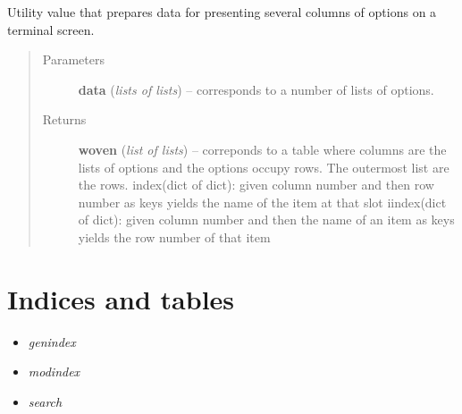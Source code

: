 \documentclass[letterpaper,10pt,english]{sphinxmanual}
\begin{document}
\begin{fulllineitems}
\begin{fulllineitems}
\end{fulllineitems}


\begin{fulllineitems}
\label{graf/graf:graf.Shell.weave}
Utility value that prepares data for presenting several columns of options
on a terminal screen.
\begin{quote}\begin{description}
\item[{Parameters}] \leavevmode
\textbf{data} (\emph{lists of lists}) --
corresponds to a number of lists of options.

\item[{Returns}] \leavevmode
\textbf{woven} (\emph{list of lists}) --
correponds to a table where columns are the lists of options
and the options occupy rows. The outermost list are the rows.
index(dict of dict): given column number and then row number as keys yields the
name of the item at that slot
iindex(dict of dict): given column number and then the name of an item as keys yields the
row number of that item

\end{description}\end{quote}

\end{fulllineitems}


\end{fulllineitems}



\chapter{Indices and tables}
\label{index:indices-and-tables}\begin{itemize}
\item {} 
\emph{genindex}

\item {} 
\emph{modindex}

\item {} 
\emph{search}

\end{itemize}
\end{document}
